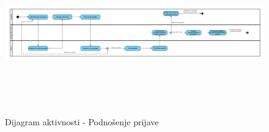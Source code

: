 \begin{figure}[H]
  \begin{center}
      \includegraphics[width = 155mm, height=70mm]{Diagrams/dijagram_aktivnosti_podnosenje_prijave.png}
  \end{center}
  \caption {Dijagram aktivnosti - Podnošenje prijave}
  \label{activity_podnosenje_prijave}

\end{figure}
\newpage



